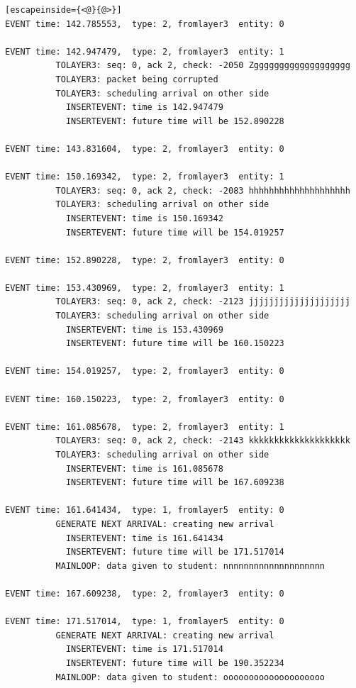 \documentclass[paper=a4, fontsize=11pt]{scrartcl}
\numberwithin{equation}{section}		%
\numberwithin{figure}{section}			%
\numberwithin{table}{section}				%
\begin{document}
\begin{lstlisting}[escapeinside={<@}{@>}]
EVENT time: 142.785553,  type: 2, fromlayer3  entity: 0

EVENT time: 142.947479,  type: 2, fromlayer3  entity: 1
          TOLAYER3: seq: 0, ack 2, check: -2050 Zggggggggggggggggggg
          TOLAYER3: packet being corrupted
          TOLAYER3: scheduling arrival on other side
            INSERTEVENT: time is 142.947479
            INSERTEVENT: future time will be 152.890228

EVENT time: 143.831604,  type: 2, fromlayer3  entity: 0

EVENT time: 150.169342,  type: 2, fromlayer3  entity: 1
          TOLAYER3: seq: 0, ack 2, check: -2083 hhhhhhhhhhhhhhhhhhhh
          TOLAYER3: scheduling arrival on other side
            INSERTEVENT: time is 150.169342
            INSERTEVENT: future time will be 154.019257

EVENT time: 152.890228,  type: 2, fromlayer3  entity: 0

EVENT time: 153.430969,  type: 2, fromlayer3  entity: 1
          TOLAYER3: seq: 0, ack 2, check: -2123 jjjjjjjjjjjjjjjjjjjj
          TOLAYER3: scheduling arrival on other side
            INSERTEVENT: time is 153.430969
            INSERTEVENT: future time will be 160.150223

EVENT time: 154.019257,  type: 2, fromlayer3  entity: 0

EVENT time: 160.150223,  type: 2, fromlayer3  entity: 0

EVENT time: 161.085678,  type: 2, fromlayer3  entity: 1
          TOLAYER3: seq: 0, ack 2, check: -2143 kkkkkkkkkkkkkkkkkkkk
          TOLAYER3: scheduling arrival on other side
            INSERTEVENT: time is 161.085678
            INSERTEVENT: future time will be 167.609238

EVENT time: 161.641434,  type: 1, fromlayer5  entity: 0
          GENERATE NEXT ARRIVAL: creating new arrival
            INSERTEVENT: time is 161.641434
            INSERTEVENT: future time will be 171.517014
          MAINLOOP: data given to student: nnnnnnnnnnnnnnnnnnnn

EVENT time: 167.609238,  type: 2, fromlayer3  entity: 0

EVENT time: 171.517014,  type: 1, fromlayer5  entity: 0
          GENERATE NEXT ARRIVAL: creating new arrival
            INSERTEVENT: time is 171.517014
            INSERTEVENT: future time will be 190.352234
          MAINLOOP: data given to student: oooooooooooooooooooo


\end{lstlisting}
\end{document}
